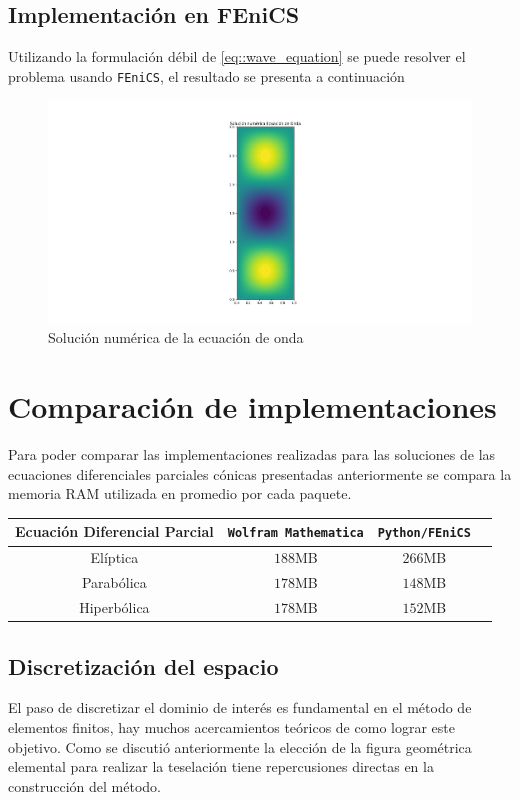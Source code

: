 \documentclass[a4paper]{article}
\begin{document}
\subsection{Implementación en FEniCS}
Utilizando la formulación débil de \ref{eq::wave_equation} se puede resolver el problema usando \texttt{FEniCS}, el resultado se presenta a continuación
\begin{figure}[H]
\includegraphics[scale=0.25, left]{./wave_FEniCS.png} 
\caption{Solución numérica de la ecuación de onda}
\label{fig::fig8}
\end{figure}
\section{Comparación de implementaciones}
Para poder comparar las implementaciones realizadas para las soluciones de las ecuaciones diferenciales parciales cónicas presentadas anteriormente se compara la memoria RAM utilizada en promedio por cada paquete.\\
\begin{center}
\begin{tabular}{ |c|c|c|c| } 
\hline
Ecuación Diferencial Parcial & \texttt{Wolfram Mathematica}& \texttt{Python/FEniCS}\\
\hline
Elíptica& $188$MB & $266$MB \\ 
Parabólica& $178$MB& $148$MB\\ 
Hiperbólica& $178$MB & $152$MB\\ 
\hline
\end{tabular}
\end{center}
\subsection{Discretización del espacio}
El paso de discretizar el dominio de interés es fundamental en el método de elementos finitos, hay muchos acercamientos teóricos de como lograr este objetivo. Como se discutió anteriormente la elección de la figura geométrica elemental para realizar la teselación tiene repercusiones directas en la construcción del método.\\
\end{document}
